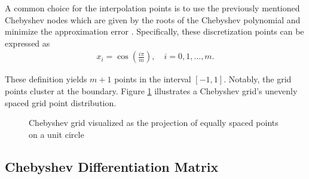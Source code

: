 A common choice for the interpolation points is to use the previously mentioned
Chebyshev nodes which are given by the roots of the Chebyshev polynomial and
minimize the approximation error \citep{boyd2001}. Specifically, these
discretization points can be expressed as
\begin{align}
x_i = \cos(\frac{i \pi}{m}), \quad i=0, 1,\dots,m.
\label{eq:cheb_nodes1d}
\end{align}

These definition yields $m+1$ points in the interval $[-1, 1]$. Notably, the
grid points cluster at the boundary. Figure \ref{fig:cheb_grid1d} illustrates a
Chebyshev grid's unevenly spaced grid point distribution.

\begin{figure}[ht]
  \centering


  \caption{Chebyshev grid visualized as the projection of equally spaced
    points on a unit circle}
  \label{fig:cheb_grid1d}
\end{figure}

\subsection{Chebyshev Differentiation Matrix}

